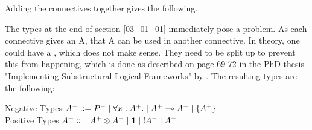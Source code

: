 Adding the connectives together gives the following.

The types at the end of section \ref{03_01_01} immediately pose a problem. As each connective gives an A, that A can be used in another connective. In theory, one could have a , which does not make sense. They need to be split up to prevent this from happening, which is done as described on page 69-72 in the PhD thesis "Implementing Substructural Logical Frameworks"\cite{asncelf} by \citeauthor{asncelf}. The resulting types are the following:
\begin{texto}
Negative Types $A^- ::= P^- \; | \; \forall x:A^+. \; | \; A^+ \multimap A^- \; | \; \{ A^+ \} $\\
Positive Types \hspace{0.8pt} $A^+ ::= A^+ \otimes A^+ \; | \; \mathord{\text{\rm\bf 1}} \; | \; \mathord{\text{\rm !}} A^- \; | \; A^- $
\end{texto}

